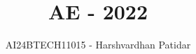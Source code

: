\documentclass[journal]{IEEEtran}
\begin{document}

\vspace{3cm}

\title{AE - 2022}
\author{AI24BTECH11015 - Harshvardhan Patidar}
 \maketitle
{\let\newpage\relax\maketitle}

\renewcommand{\thefigure}{\theenumi}
\renewcommand{\thetable}{\theenumi}
\setlength{\intextsep}{10pt} %


\renewcommand{\thetable}{\theenumi}
\end{document}
